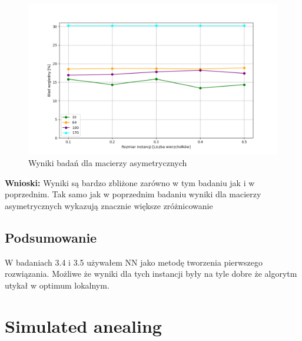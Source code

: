 \documentclass{article}
\begin{document}
        \begin{figure}[ht]
          \centering
          \includegraphics[width=\textwidth]{src/plots/asymTsTabuLen.png}
          \caption{Wyniki badań dla macierzy asymetrycznych}
          \label{fig:asymTabuLen}
        \end{figure}
        \FloatBarrier
        \textbf{Wnioski: } Wyniki są bardzo zbliżone zarówno w tym badaniu jak i 
        w poprzednim. Tak samo jak w poprzednim badaniu wyniki dla macierzy 
        asymetrycznych wykazują znacznie większe zróżnicowanie
      \subsection{Podsumowanie}
        W badaniach 3.4 i 3.5 używałem NN jako metodę tworzenia pierwszego rozwiązania.
        Możliwe że wyniki dla tych instancji były na tyle dobre że algorytm utykał w
        optimum lokalnym.
    \section{Simulated anealing}
\end{document}
